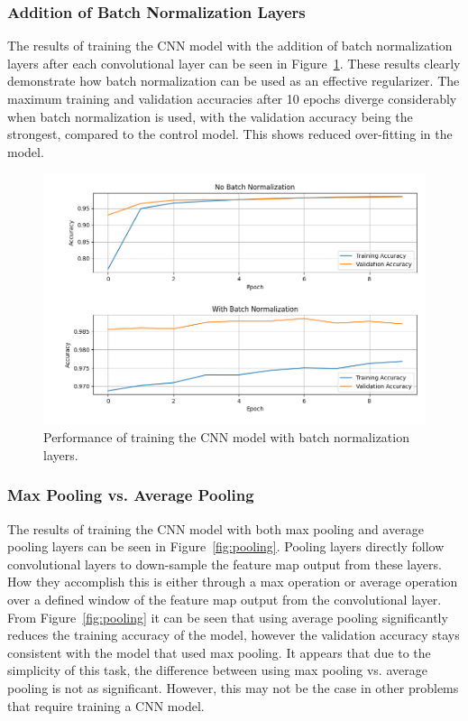 \documentclass[a4paper]{article}
\begin{document}
\subsubsection{Addition of Batch Normalization Layers}

The results of training the CNN model with the addition of batch normalization layers after each convolutional layer can be seen in Figure~\ref{fig:batch-norm}. These results clearly demonstrate how batch normalization can be used as an effective regularizer. The maximum training and validation accuracies after 10 epochs diverge considerably when batch normalization is used, with the validation accuracy being the strongest, compared to the control model. This shows reduced over-fitting in the model.

\begin{figure}[h]
    \centering
    \includegraphics[scale=0.5]{images/batch-norm-cnn.png}
    \caption{Performance of training the CNN model with batch normalization layers.}
    \label{fig:batch-norm}
\end{figure}

\subsubsection{Max Pooling vs. Average Pooling}

The results of training the CNN model with both max pooling and average pooling layers can be seen in Figure~\ref{fig:pooling}. Pooling layers directly follow convolutional layers to down-sample the feature map output from these layers. How they accomplish this is either through a max operation or average operation over a defined window of the feature map output from the convolutional layer. From Figure~\ref{fig:pooling} it can be seen that using average pooling significantly reduces the training accuracy of the model, however the validation accuracy stays consistent with the model that used max pooling. It appears that due to the simplicity of this task, the difference between using max pooling vs. average pooling is not as significant. However, this may not be the case in other problems that require training a CNN model.
\end{document}

